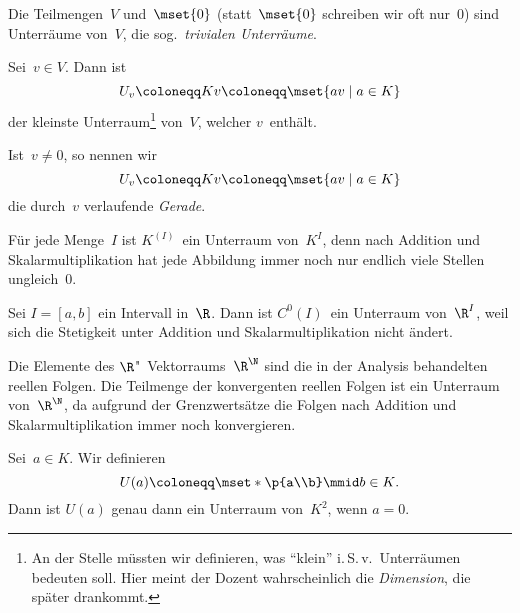 \documentclass[a4paper]{article}
\begin{document}
\begin{example}
    Die Teilmengen~$V$ und~$\mset{0}$ (statt~$\mset{0}$ schreiben wir oft nur~$0$) sind Unterräume von~$V$, die sog.\ \emph{trivialen Unterräume}.
\end{example}

\begin{example}
    Sei~$v \in V$. Dann ist
    \begin{equation*}
        U_v \coloneqq Kv \coloneqq \mset{av \mid a \in K}
    \end{equation*}
    der kleinste Unterraum\footnote{An der Stelle müssten wir definieren, was "`klein"' i.\,S.\,v.\ Unterräumen bedeuten soll. Hier meint der Dozent wahrscheinlich die \emph{Dimension}, die später drankommt.} von~$V$, welcher $v$~enthält.
\end{example}

\begin{definition}[Gerade]
    Ist~$v \neq 0$, so nennen wir
    \begin{equation*}
        U_v \coloneqq Kv \coloneqq \mset{av \mid a \in K}
    \end{equation*}
    die durch~$v$ verlaufende \emph{Gerade}.
\end{definition}

\begin{example}
    Für jede Menge~$I$ ist $K^{(I)}$~ein Unterraum von~$K^I$, denn nach Addition und Skalarmultiplikation hat jede Abbildung immer noch nur endlich viele Stellen ungleich~$0$.
\end{example}

\begin{example}
    Sei $I = [a,b]$ ein Intervall in~$\R$. Dann ist $C^0(I)$~ein Unterraum von~$\R^I$, weil sich die Stetigkeit unter Addition und Skalarmultiplikation nicht ändert.
\end{example}

\begin{example}
    Die Elemente des $\R$"~Vektorraums~$\R^\N$ sind die in der Analysis behandelten reellen Folgen. Die Teilmenge der konvergenten reellen Folgen ist ein Unterraum von~$\R^\N$, da aufgrund der Grenzwertsätze die Folgen nach Addition und Skalarmultiplikation immer noch konvergieren.
\end{example}

\begin{example}
    Sei~$a \in K$. Wir definieren
    \begin{equation*}
        U(a) \coloneqq \mset*{\p{a\\b} \mmid b \in K}.
    \end{equation*}
    Dann ist $U(a)$ genau dann ein Unterraum von~$K^2$, wenn $a = 0$.
\end{example}
\end{document}
